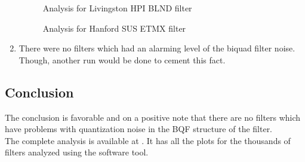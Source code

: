 \documentclass[colorlinks=true,pdfstartview=FitV,linkcolor=blue,
            citecolor=red,urlcolor=magenta]{ligodoc}
\begin{document}
\begin{enumerate}
\begin{figure}[H]
			  \centering
			  \def\svgscale{0.5}
			  \tiny{
			  
			  }
			  \caption{Analysis for Livingston HPI BLND filter}
		\end{figure}
		\begin{figure}[H]
 
			  \centering
			  \def\svgscale{0.5}
			  \tiny{
			  
			  }
			  \caption{Analysis for Hanford SUS ETMX filter}
		\end{figure}
		\item There were no filters which had an alarming level of the biquad filter noise. Though, another run would be done to cement this fact. 
	\end{enumerate}
	\subsection{Conclusion} The conclusion is favorable and on a positive note that there are no filters which have problems with quantization noise in the BQF structure of the filter. \\
	The complete analysis is available at \cite{drive}. It has all the plots for the thousands of filters analyzed using the software tool.
\end{document}
